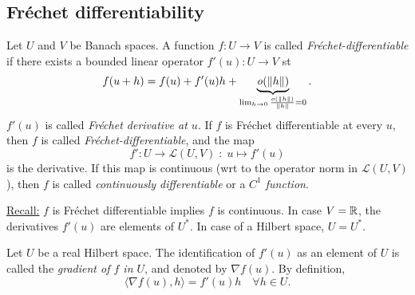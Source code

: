 \documentclass[../skript.tex]{subfiles}
\begin{document}
\subsection{Fréchet differentiability}
\begin{definition} %
\label{def:c1e20}
Let $U$ and $V$ be Banach spaces. A function $f : U \to V$ is called \emph{Fréchet-differentiable} if there exists a bounded linear operator $f'(u) : U \to V$ \ac{st}
\[
	f(u +h) = f(u) + f'(u) h + \underbrace{ \mathit{o}(\| h \|) }_{\lim_{h \to 0} \frac{o (\| h \|)}{\| h \|} = 0}.
\]
$f'(u)$ is called \emph{Fréchet derivative at $u$}.
If $f$ is Fréchet differentiable at every $u$, then $f$ is called \emph{Fréchet-differentiable}, and the map
\[
	f' : U \to \mathcal{L}(U, V) \; : \; u \mapsto f'(u)
\]
is the derivative.
If this map is continuous (\ac{wrt} to the operator norm in $\mathcal{L}(U, V)$), then $f$ is called \emph{continuously differentiable} or a \emph{$C^1$ function}.
\end{definition}
\underline{Recall:} $f$ is Fréchet differentiable implies $f$ is continuous.
In case $V = \mathbb{R}$, the derivatives $f'(u)$ are elements of $U^*$. In case of a Hilbert space, $U = U^*$.
\begin{definition} %
\label{def:c1e21}
Let $U$ be a real Hilbert space.
The identification of $f'(u)$ as an element of $U$ is called the \emph{gradient of $f$ in $U$}, and denoted by $\nabla f(u)$. By definition,
\[
	\langle \nabla f(u), h \rangle = f'(u)h \quad \forall h \in U.
\]
\end{definition}
\addtocounter{dummythm}{-1} %
\begin{examplenumb} %
\label{ex:c1e21}
\end{examplenumb}
\end{document}
